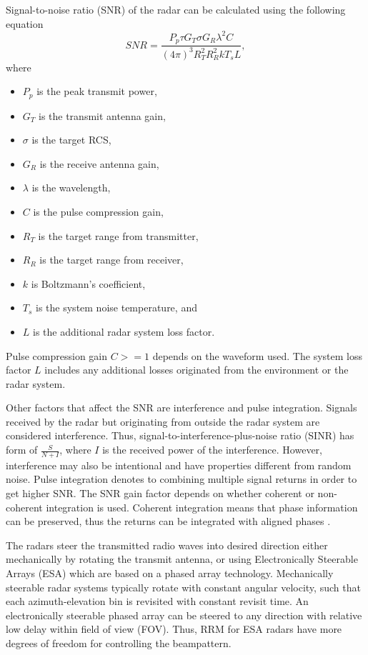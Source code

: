 \documentclass[english, 12pt, a4paper, elec, utf8, a-1b, online]{aaltothesis}
\begin{document}
Signal-to-noise ratio (SNR) of the radar can be calculated using the following equation \cite{Curry2011}
\begin{equation} \label{eq:radar_snr}
SNR = \frac{P_p \tau G_T \sigma G_R \lambda^2 C}{(4\pi)^3 R_T^2 R_R^2 k T_s L},
\end{equation}
where
\begin{itemize}
    \item $P_p$ is the peak transmit power,
    \item $G_T$ is the transmit antenna gain,
    \item $\sigma$ is the target RCS,
    \item $G_R$ is the receive antenna gain,
    \item $\lambda$ is the wavelength,
    \item $C$ is the pulse compression gain,
    \item $R_T$ is the target range from transmitter,
    \item $R_R$ is the target range from receiver,
    \item $k$ is Boltzmann's coefficient,
    \item $T_s$ is the system noise temperature, and 
    \item $L$ is the additional radar system loss factor.
\end{itemize}
Pulse compression gain $C >= 1$ depends on the waveform used.
The system loss factor $L$ includes any additional losses originated from the environment or the radar system.

Other factors that affect the SNR are interference and pulse integration.
Signals received by the radar but originating from outside the radar system are considered interference.
Thus, signal-to-interference-plus-noise ratio (SINR) has form of $\frac{S}{N+I}$, where
$I$ is the received power of the interference.
However, interference may also be intentional and have properties  different from random noise. 
Pulse integration denotes to combining multiple signal returns in order to get higher SNR.
The SNR gain factor depends on whether coherent or non-coherent integration is used.
Coherent integration means that phase information can be preserved, thus the returns can be integrated with aligned phases \cite{Curry2011}.

The radars steer the transmitted radio waves into desired direction either mechanically by rotating the transmit antenna, or using Electronically Steerable Arrays (ESA) which are based on a phased array technology.
Mechanically steerable radar systems typically rotate with constant angular velocity, such that each azimuth-elevation bin is revisited with constant revisit time.
An electronically steerable phased array can be steered to any direction with relative low delay within field of view (FOV).
Thus, RRM for ESA radars have more degrees of freedom for controlling the beampattern.
\end{document}
